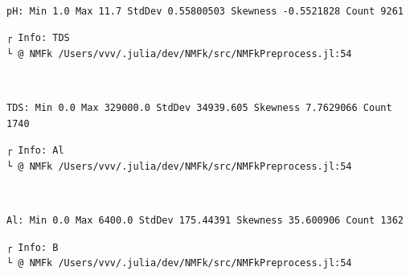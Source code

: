 \documentclass[11pt]{article}
\begin{document}
    \begin{center}
    \end{center}
    { \hspace*{\fill} \\}
    
    \begin{Verbatim}[commandchars=\\\{\}]
pH: Min 1.0 Max 11.7 StdDev 0.55800503 Skewness -0.5521828 Count 9261
    \end{Verbatim}

    \begin{Verbatim}[commandchars=\\\{\}]
┌ Info: TDS
└ @ NMFk /Users/vvv/.julia/dev/NMFk/src/NMFkPreprocess.jl:54
    \end{Verbatim}

    \begin{center}
    \end{center}
    { \hspace*{\fill} \\}
    
    \begin{Verbatim}[commandchars=\\\{\}]
TDS: Min 0.0 Max 329000.0 StdDev 34939.605 Skewness 7.7629066 Count 1740
    \end{Verbatim}

    \begin{Verbatim}[commandchars=\\\{\}]
┌ Info: Al
└ @ NMFk /Users/vvv/.julia/dev/NMFk/src/NMFkPreprocess.jl:54
    \end{Verbatim}

    \begin{center}
    \end{center}
    { \hspace*{\fill} \\}
    
    \begin{Verbatim}[commandchars=\\\{\}]
Al: Min 0.0 Max 6400.0 StdDev 175.44391 Skewness 35.600906 Count 1362
    \end{Verbatim}

    \begin{Verbatim}[commandchars=\\\{\}]
┌ Info: B
└ @ NMFk /Users/vvv/.julia/dev/NMFk/src/NMFkPreprocess.jl:54
    \end{Verbatim}
\end{document}
